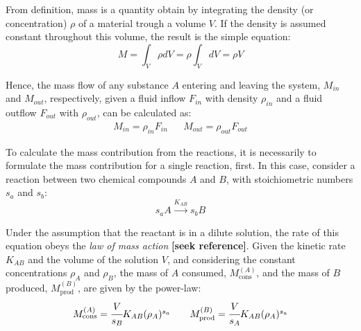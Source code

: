 \documentclass[a4paper,11pt]{book}
\numberwithin{figure}{chapter}
\numberwithin{equation}{chapter}
\numberwithin{table}{chapter}
\theoremstyle{definition}
\begin{document}
From definition, mass is a quantity obtain by integrating the density (or concentration) $\rho$ of a material trough a volume $V$. If the density is assumed constant throughout this volume, the result is the simple equation:
\begin{equation}
	M = \int_V \rho dV = \rho \int_V dV = \rho V
\end{equation}

Hence, the mass flow of any substance $A$ entering and leaving the system, $M_{in}$ and $M_{out}$, respectively, given a fluid inflow $F_{in}$ with density $\rho_{in}$ and a fluid outflow $F_{out}$ with $\rho_{out}$, can be calculated as:
\begin{equation}
	\begin{matrix}
		M_{in} = \rho_{in} F_{in} & & M_{out} = \rho_{out} F_{out}
	\end{matrix}
\end{equation}

To calculate the mass contribution from the reactions, it is necessarily to formulate the mass contribution for a single reaction, first. In this case, consider a reaction between two chemical compounds $A$ and $B$, with stoichiometric numbers $s_{a}$ and $s_{b}$:
\begin{equation} \label{eq:simpleEq01}
	s_{a} A \overset{K_{AB}}{\longrightarrow} s_{b} B
\end{equation}

Under the assumption that the reactant is in a dilute solution, the rate of this equation obeys the \textit{law of mass action} \textbf{[seek reference]}. Given the kinetic rate $K_{AB}$ and the volume of the solution $V$, and considering the constant concentrations $\rho_A$ and $\rho_B$, the mass of $A$ consumed, $M^{(A)}_\text{cons}$, and the mass of $B$ produced, $M^{(B)}_\text{prod}$, are given by the power-law:
\begin{equation}
	\begin{matrix}
		M^{(A)}_\text{cons} = \cfrac{V}{s_B} K_{AB} (\rho_A)^{s_{a}} & & M^{(B)}_\text{prod} = \cfrac{V}{s_A} K_{AB} (\rho_A)^{s_{a}}
	\end{matrix}
\end{equation}
\end{document}
